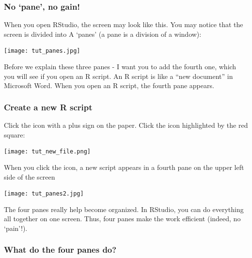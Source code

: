 \documentclass[
]{book}
\begin{document}
\hypertarget{no-pane-no-gain}{%
\subsubsection{No `pane', no gain!}\label{no-pane-no-gain}}

When you open RStudio, the screen may look like this. You may notice that the screen is divided into A `panes' (a pane is a division of a window):

\texttt{[image: tut\_panes.jpg]}

Before we explain these three panes - I want you to add the fourth one, which you will see if you open an R script. An R script is like a ``new document'' in Microsoft Word. When you open an R script, the fourth pane appears.

\hypertarget{create-a-new-r-script}{%
\subsubsection{Create a new R script}\label{create-a-new-r-script}}

Click the icon with a plus sign on the paper. Click the icon highlighted by the red square:

\texttt{[image: tut\_new\_file.png]}

When you click the icon, a new script appears in a fourth pane on the upper left side of the screen

\texttt{[image: tut\_panes2.jpg]}

The four panes really help become organized. In RStudio, you can do everything all together on one screen. Thus, four panes make the work efficient (indeed, no `pain'!).

\hypertarget{what-do-the-four-panes-do}{%
\subsubsection{What do the four panes do?}\label{what-do-the-four-panes-do}}
\end{document}
